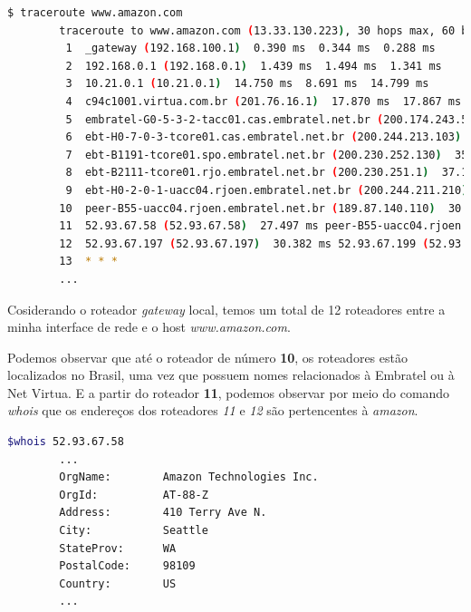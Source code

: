 \documentclass[12pt,a4paper]{report}
\begin{document}
\begin{lstlisting}[language=bash]
        $ traceroute www.amazon.com   
        traceroute to www.amazon.com (13.33.130.223), 30 hops max, 60 byte packets
         1  _gateway (192.168.100.1)  0.390 ms  0.344 ms  0.288 ms
         2  192.168.0.1 (192.168.0.1)  1.439 ms  1.494 ms  1.341 ms
         3  10.21.0.1 (10.21.0.1)  14.750 ms  8.691 ms  14.799 ms
         4  c94c1001.virtua.com.br (201.76.16.1)  17.870 ms  17.867 ms  18.191 ms
         5  embratel-G0-5-3-2-tacc01.cas.embratel.net.br (200.174.243.53)  20.587 ms embratel-T0-3-0-0-uacc02.cas.embratel.net.br (189.16.179.53)  22.126 ms  22.086 ms
         6  ebt-H0-7-0-3-tcore01.cas.embratel.net.br (200.244.213.103)  33.239 ms ebt-H0-4-0-0-tcore01.cas.embratel.net.br (200.244.212.61)  36.143 ms ebt-H0-7-0-3-tcore01.cas.embratel.net.br (200.244.213.103)  24.095 ms
         7  ebt-B1191-tcore01.spo.embratel.net.br (200.230.252.130)  35.167 ms  33.017 ms  24.929 ms
         8  ebt-B2111-tcore01.rjo.embratel.net.br (200.230.251.1)  37.181 ms  31.957 ms  33.497 ms
         9  ebt-H0-2-0-1-uacc04.rjoen.embratel.net.br (200.244.211.210)  30.454 ms  30.465 ms ebt-H0-7-0-1-uacc04.rjoen.embratel.net.br (200.244.211.214)  30.384 ms
        10  peer-B55-uacc04.rjoen.embratel.net.br (189.87.140.110)  30.038 ms  28.433 ms  28.439 ms
        11  52.93.67.58 (52.93.67.58)  27.497 ms peer-B55-uacc04.rjoen.embratel.net.br (189.87.140.110)  26.865 ms  21.708 ms
        12  52.93.67.197 (52.93.67.197)  30.382 ms 52.93.67.199 (52.93.67.199)  30.470 ms *
        13  * * *
        ...
\end{lstlisting}

Cosiderando o roteador \emph{gateway} local, temos um total de 12 roteadores entre a minha interface de rede e o host \emph{www.amazon.com}.

Podemos observar que até o roteador de número \textbf{10}, os roteadores estão localizados no Brasil, uma vez que possuem nomes relacionados à Embratel ou à Net Virtua.
E a partir do roteador \textbf{11}, podemos observar por meio do comando \emph{whois} que os endereços dos roteadores \emph{11} e \emph{12} são pertencentes à \emph{amazon}.

\begin{lstlisting}[language=bash]
        $whois 52.93.67.58
        ... 
        OrgName:        Amazon Technologies Inc.
        OrgId:          AT-88-Z
        Address:        410 Terry Ave N.
        City:           Seattle
        StateProv:      WA
        PostalCode:     98109
        Country:        US
        ...
\end{lstlisting}
\end{document}
